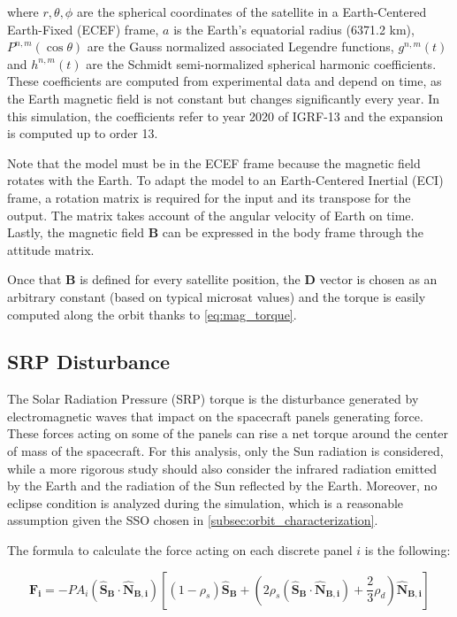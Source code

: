 where $r, \theta, \phi$ are the spherical coordinates of the satellite in a Earth-Centered Earth-Fixed (ECEF) frame, $a$ is the Earth's equatorial radius (6371.2 km), $P^{n,m} (\cos \theta)$ are the Gauss normalized associated Legendre functions, $g^{n,m} (t)$ and $h^{n,m} (t)$ are the Schmidt semi-normalized spherical harmonic coefficients.
These coefficients are computed from experimental data and depend on time, as the Earth magnetic field is not constant but changes significantly every year. In this simulation, the coefficients refer to year 2020 of IGRF-13 and the expansion is computed up to order 13.

Note that the model must be in the ECEF frame because the magnetic field rotates with the Earth. To adapt the model to an Earth-Centered Inertial (ECI) frame, a rotation matrix is required for the input and its transpose for the output. The matrix takes account of the angular velocity of Earth on time. Lastly, the magnetic field $\boldsymbol{B}$ can be expressed in the body frame through the attitude matrix.

Once that $\boldsymbol{B}$ is defined for every satellite position, the $\boldsymbol{D}$ vector is chosen as an arbitrary constant (based on typical microsat values) and the torque is easily computed along the orbit thanks to \autoref{eq:mag_torque}.


\subsection{SRP Disturbance}
\label{subsec:dist_SRP}

The Solar Radiation Pressure (SRP) torque is the disturbance generated by electromagnetic waves that impact on the spacecraft panels generating force. These forces acting on some of the panels can rise a net torque around the center of mass of the spacecraft. For this analysis, only the Sun radiation is considered, while a more rigorous study should also consider the infrared radiation emitted by the Earth and the radiation of the Sun reflected by the Earth. Moreover, no eclipse condition is analyzed during the simulation, which is a reasonable assumption given the SSO chosen in \autoref{subsec:orbit_characterization}.

The formula to calculate the force acting on each discrete panel $i$ is the following:

\begin{equation}
    \boldsymbol{F_i} = -P A_i \left( \boldsymbol{\hat{S}_B} \cdot \boldsymbol{\hat{N}_{B,i}} \right) \left[ \left( 1 - \rho_s \right) \boldsymbol{\hat{S}_B} + \left( 2 \rho_s \left( \boldsymbol{\hat{S}_B} \cdot \boldsymbol{\hat{N}_{B,i}} \right) + \frac{2}{3} \rho_d \right) \boldsymbol{\hat{N}_{B,i}} \right]
\end{equation}


